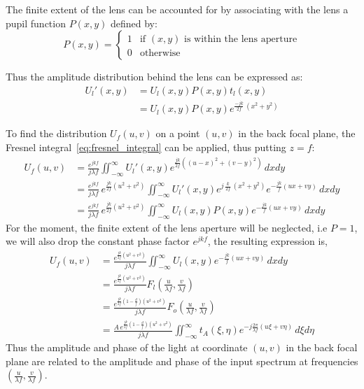 \documentclass{article}
\begin{document}
The finite extent of the lens can be accounted for by associating with the lens a pupil function $P(x,y)$ defined by:
\begin{equation}
    P(x,y) = \begin{cases}
1 & \text{if } (x,y) \text{ is within the lens aperture} \\
0 & \text{otherwise}
\end{cases}
\end{equation}

Thus the amplitude distribution behind the lens can be expressed as:
\begin{align}
    U_l'(x,y) &= U_l(x,y) P(x,y) t_l(x,y) \\
    &= U_l(x,y) P(x,y) e^{\frac{-jk}{2f} \, (x^2 + y^2)}
\end{align}

To find the distribution $U_f(u,v)$ on a point $(u,v)$ in the back focal plane, the Fresnel integral~\cref{eq:fresnel_integral} can be applied, thus putting $z=f$:
\begin{align}
    U_f(u,v) &= \frac{e^{jkf}}{j\lambda f} \iint_{-\infty}^{\infty} U_l'(x,y) e^{\frac{jk}{2f}\left((u-x)^2 + (v-y)^2\right)} \, dx dy \\
    &= \frac{e^{jkf}}{j\lambda f} \, e^{\frac{jk}{2f}(u^2 + v^2)} \iint_{-\infty}^{\infty} U_l'(x,y) e^{j \, \frac{k}{2f} \, (x^2 + y^2)} e^{-\frac{jk}{f}(ux + vy)} \, dx dy \\ 
        &= \frac{e^{jkf}}{j\lambda f} \, e^{\frac{jk}{2f}(u^2 + v^2)} \iint_{-\infty}^{\infty} U_l(x,y) P(x,y) e^{-\frac{jk}{f}(ux + vy)} \, dx dy
\end{align}
For the moment, the finite extent of the lens aperture will be neglected, i.e $P = 1$, we will also drop the constant phase factor $e^{jkf}$, the resulting expression is,
\begin{align}
    U_f(u,v) &= \frac{e^{\frac{jk}{2f}(u^2 + v^2)}}{j\lambda f} \iint_{-\infty}^{\infty} U_l(x,y) e^{-\frac{jk}{f}(ux + vy)} \, dx dy \\
    &= \frac{e^{\frac{jk}{2f}(u^2 + v^2)}}{j\lambda f} F_l\left(\frac{u}{\lambda f}, \frac{v}{\lambda f}\right) \\
    &= \frac{e^{\frac{jk}{2f} (1-\frac{d}{f})(u^2 + v^2)}}{j\lambda f}  F_o\left(\frac{u}{\lambda f}, \frac{v}{\lambda f}\right) \\
    &= \frac{A \, e^{\frac{jk}{2f} (1-\frac{d}{f})(u^2 + v^2)}}{j\lambda f} \iint_{-\infty}^{\infty} t_A(\xi,\eta) e^{-j\frac{2\pi}{\lambda f}(u\xi + v\eta)} \, d\xi d\eta
\end{align}
Thus the amplitude and phase of the light at coordinate $(u,v)$ in the back focal plane are related to the amplitude and phase of the input spectrum at frequencies $(\frac{u}{\lambda f}, \frac{v}{\lambda f})$.
\end{document}

